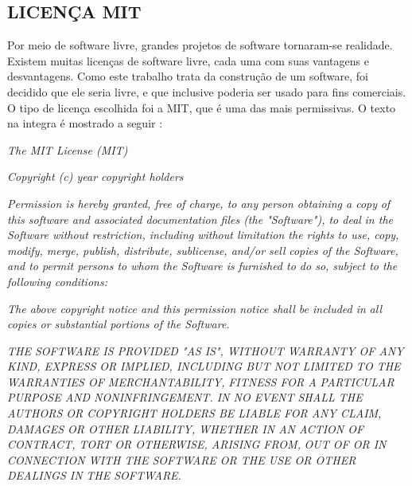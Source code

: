 \subsection{LICENÇA MIT}
\label{mit_sec}

Por meio de software livre, grandes projetos de software tornaram-se realidade. Existem muitas licenças de software livre, cada uma com suas vantagens e desvantagens. Como este trabalho trata da construção de um software, foi decidido que ele seria livre, e que inclusive poderia ser usado para fins comerciais. O tipo de licença escolhida foi a MIT, que é uma das mais permissivas. O texto na integra é mostrado a seguir \cite{MIT2015}:

\begin{citacao}


\emph{The MIT License (MIT)}

\emph{Copyright (c) year copyright holders}

\emph{Permission is hereby granted, free of charge, to any person obtaining a copy}
\emph{of this software and associated documentation files (the "Software"), to deal}
\emph{in the Software without restriction, including without limitation the rights}
\emph{to use, copy, modify, merge, publish, distribute, sublicense, and/or sell}
\emph{copies of the Software, and to permit persons to whom the Software is}
\emph{furnished to do so, subject to the following conditions:}

\emph{The above copyright notice and this permission notice shall be included in}
\emph{all copies or substantial portions of the Software.}

\emph{THE SOFTWARE IS PROVIDED "AS IS", WITHOUT WARRANTY OF ANY KIND, EXPRESS OR}
\emph{IMPLIED, INCLUDING BUT NOT LIMITED TO THE WARRANTIES OF MERCHANTABILITY,}
\emph{FITNESS FOR A PARTICULAR PURPOSE AND NONINFRINGEMENT. IN NO EVENT SHALL THE}
\emph{AUTHORS OR COPYRIGHT HOLDERS BE LIABLE FOR ANY CLAIM, DAMAGES OR OTHER}
\emph{LIABILITY, WHETHER IN AN ACTION OF CONTRACT, TORT OR OTHERWISE, ARISING FROM,}
\emph{OUT OF OR IN CONNECTION WITH THE SOFTWARE OR THE USE OR OTHER DEALINGS IN}
\emph{THE SOFTWARE.}

\end{citacao}

